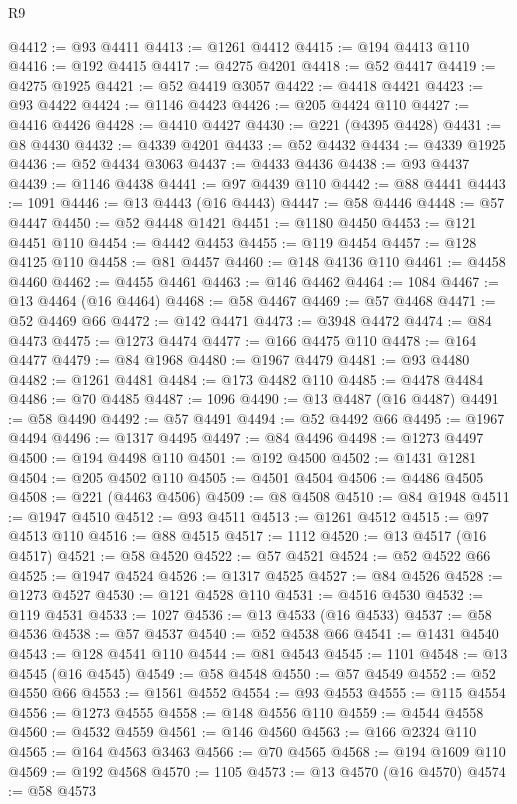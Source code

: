\begin{lexlean}{R9}
\begin{coremodule}
@4412 := @93 @4411
@4413 := @1261 @4412
@4415 := @194 @4413 @110
@4416 := @192 @4415
@4417 := @4275 @4201
@4418 := @52 @4417
@4419 := @4275 @1925
@4421 := @52 @4419 @3057
@4422 := @4418 @4421
@4423 := @93 @4422
@4424 := @1146 @4423
@4426 := @205 @4424 @110
@4427 := @4416 @4426
@4428 := @4410 @4427
@4430 := @221 (@4395 @4428)
@4431 := @8 @4430
@4432 := @4339 @4201
@4433 := @52 @4432
@4434 := @4339 @1925
@4436 := @52 @4434 @3063
@4437 := @4433 @4436
@4438 := @93 @4437
@4439 := @1146 @4438
@4441 := @97 @4439 @110
@4442 := @88 @4441
@4443 := 1091
@4446 := @13 @4443 (@16 @4443)
@4447 := @58 @4446
@4448 := @57 @4447
@4450 := @52 @4448 @1421
@4451 := @1180 @4450
@4453 := @121 @4451 @110
@4454 := @4442 @4453
@4455 := @119 @4454
@4457 := @128 @4125 @110
@4458 := @81 @4457
@4460 := @148 @4136 @110
@4461 := @4458 @4460
@4462 := @4455 @4461
@4463 := @146 @4462
@4464 := 1084
@4467 := @13 @4464 (@16 @4464)
@4468 := @58 @4467
@4469 := @57 @4468
@4471 := @52 @4469 @66
@4472 := @142 @4471
@4473 := @3948 @4472
@4474 := @84 @4473
@4475 := @1273 @4474
@4477 := @166 @4475 @110
@4478 := @164 @4477
@4479 := @84 @1968
@4480 := @1967 @4479
@4481 := @93 @4480
@4482 := @1261 @4481
@4484 := @173 @4482 @110
@4485 := @4478 @4484
@4486 := @70 @4485
@4487 := 1096
@4490 := @13 @4487 (@16 @4487)
@4491 := @58 @4490
@4492 := @57 @4491
@4494 := @52 @4492 @66
@4495 := @1967 @4494
@4496 := @1317 @4495
@4497 := @84 @4496
@4498 := @1273 @4497
@4500 := @194 @4498 @110
@4501 := @192 @4500
@4502 := @1431 @1281
@4504 := @205 @4502 @110
@4505 := @4501 @4504
@4506 := @4486 @4505
@4508 := @221 (@4463 @4506)
@4509 := @8 @4508
@4510 := @84 @1948
@4511 := @1947 @4510
@4512 := @93 @4511
@4513 := @1261 @4512
@4515 := @97 @4513 @110
@4516 := @88 @4515
@4517 := 1112
@4520 := @13 @4517 (@16 @4517)
@4521 := @58 @4520
@4522 := @57 @4521
@4524 := @52 @4522 @66
@4525 := @1947 @4524
@4526 := @1317 @4525
@4527 := @84 @4526
@4528 := @1273 @4527
@4530 := @121 @4528 @110
@4531 := @4516 @4530
@4532 := @119 @4531
@4533 := 1027
@4536 := @13 @4533 (@16 @4533)
@4537 := @58 @4536
@4538 := @57 @4537
@4540 := @52 @4538 @66
@4541 := @1431 @4540
@4543 := @128 @4541 @110
@4544 := @81 @4543
@4545 := 1101
@4548 := @13 @4545 (@16 @4545)
@4549 := @58 @4548
@4550 := @57 @4549
@4552 := @52 @4550 @66
@4553 := @1561 @4552
@4554 := @93 @4553
@4555 := @115 @4554
@4556 := @1273 @4555
@4558 := @148 @4556 @110
@4559 := @4544 @4558
@4560 := @4532 @4559
@4561 := @146 @4560
@4563 := @166 @2324 @110
@4565 := @164 @4563 @3463
@4566 := @70 @4565
@4568 := @194 @1609 @110
@4569 := @192 @4568
@4570 := 1105
@4573 := @13 @4570 (@16 @4570)
@4574 := @58 @4573

\end{coremodule}
\end{lexlean}
